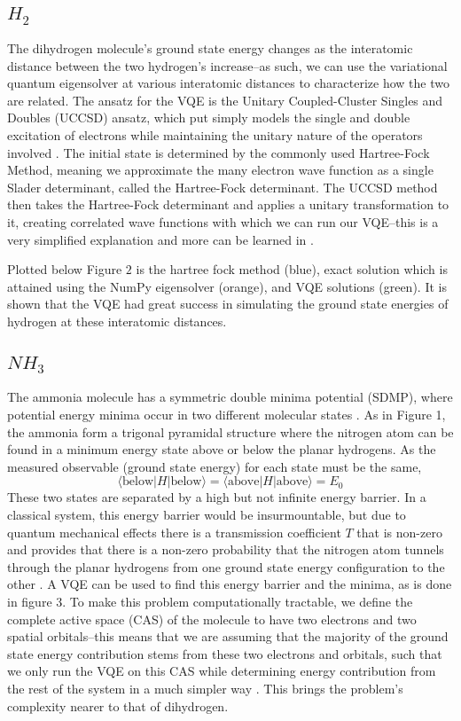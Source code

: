\documentclass[10pt,twocolumn,letterpaper]{article}
\begin{document}
\subsection{$H_2$}
The dihydrogen molecule's ground state energy changes as the interatomic distance between the two hydrogen's increase\cite{vqe_vid}--as such, we can use the variational quantum eigensolver at various interatomic distances to characterize how the two are related. The ansatz for the VQE is the Unitary Coupled-Cluster Singles and Doubles (UCCSD) ansatz, which put simply models the single and double excitation of electrons while maintaining the unitary nature of the operators involved \cite{qiskit_nature}. The initial state is determined by the commonly used Hartree-Fock Method, meaning we approximate the many electron wave function as a single Slader determinant, called the Hartree-Fock determinant. The UCCSD method then takes the Hartree-Fock determinant and applies a unitary transformation to it, creating correlated wave functions with which we can run our VQE--this is a very simplified explanation and more can be learned in \cite{qiskit_nature}.

Plotted below Figure $2$ is the hartree fock method (blue), exact solution which is attained using the NumPy eigensolver (orange), and VQE solutions (green). It is shown that the VQE had great success in simulating the ground state energies of hydrogen at these interatomic distances. 
\subsection{$NH_3$}
The ammonia molecule has a symmetric double minima potential (SDMP), where potential energy minima occur in two different molecular states \cite{nh3}. As in Figure 1, the ammonia form a trigonal pyramidal structure where the nitrogen atom can be found in a minimum energy state above or below the planar hydrogens. As the measured observable (ground state energy) for each state must be the same, $$\langle \text{below} | H | \text{below} \rangle = \langle \text{above} | H | \text{above} \rangle = E_0$$
These two states are separated by a high but not infinite energy barrier. In a classical system, this energy barrier would be insurmountable, but due to quantum mechanical effects there is a transmission coefficient $T$ that is non-zero and provides that there is a non-zero probability that the nitrogen atom tunnels through the planar hydrogens from one ground state energy configuration to the other \cite{townsend}. A VQE can be used to find this energy barrier and the minima, as is done in figure 3. To make this problem computationally tractable, we define the complete active space (CAS) of the molecule to have two electrons and two spatial orbitals--this means that we are assuming that the majority of the ground state energy contribution stems from these two electrons and orbitals, such that we only run the VQE on this CAS while determining energy contribution from the rest of the system in a much simpler way \cite{vqe}. This brings the problem's complexity nearer to that of dihydrogen.
\end{document}
